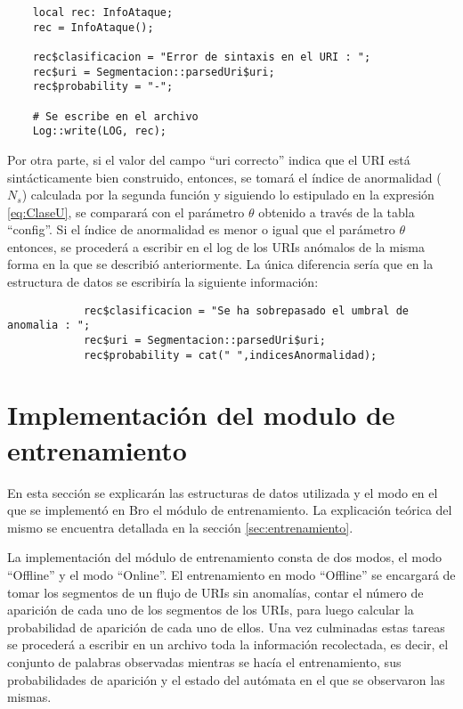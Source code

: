 \begin{verbatim}
    local rec: InfoAtaque;
    rec = InfoAtaque();

    rec$clasificacion = "Error de sintaxis en el URI : ";
    rec$uri = Segmentacion::parsedUri$uri;
    rec$probability = "-";

    # Se escribe en el archivo
    Log::write(LOG, rec);
\end{verbatim}

Por otra parte, si el valor del campo “uri correcto” indica que el URI está sintácticamente bien construido, entonces, se tomará el índice de anormalidad ($N_{s}$) calculada por la segunda función y siguiendo lo estipulado en la expresión \ref{eq:ClaseU}, se comparará con el parámetro $\theta$ obtenido a través de la tabla “config”. Si el índice de anormalidad es menor o igual que el parámetro $\theta$ entonces, se procederá a escribir en el log de los URIs anómalos de la misma forma en la que se describió anteriormente. La única diferencia sería que en la estructura de datos se escribiría la siguiente información:

\begin{verbatim}
            rec$clasificacion = "Se ha sobrepasado el umbral de anomalia : ";
            rec$uri = Segmentacion::parsedUri$uri;
            rec$probability = cat(" ",indicesAnormalidad);
\end{verbatim}

\section{Implementación del modulo de entrenamiento}

En esta sección se explicarán las estructuras de datos utilizada y el modo en el que se implementó en Bro el módulo de entrenamiento. La explicación teórica del mismo se encuentra detallada en la sección \ref{sec:entrenamiento}.
    
    La implementación del módulo de entrenamiento consta de dos modos, el modo “Offline” y el modo “Online”. El entrenamiento en modo “Offline” se encargará de tomar los segmentos de un flujo de URIs sin anomalías, contar el número de aparición de cada uno de los segmentos de los URIs, para luego calcular la probabilidad de aparición de cada uno de ellos. Una vez culminadas estas tareas se procederá a escribir en un archivo toda la información recolectada, es decir, el conjunto de palabras observadas mientras se hacía el entrenamiento, sus probabilidades de aparición y el estado del autómata en el que se observaron las mismas.

